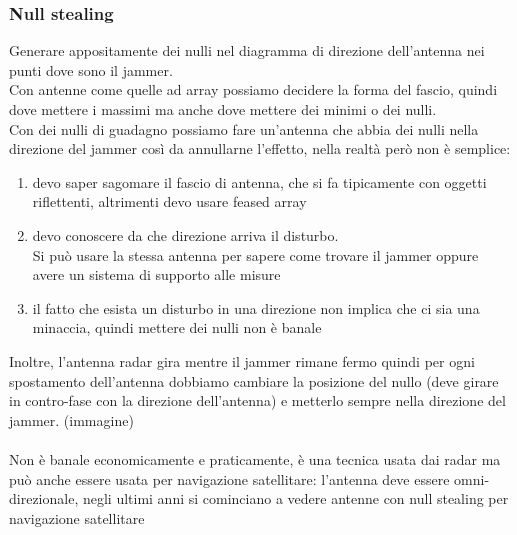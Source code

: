 \documentclass[oneside, 12pt]{extbook}
\begin{document}
\subsubsection{Null stealing}
Generare appositamente dei nulli nel diagramma di direzione dell'antenna nei punti dove sono il jammer.\\
Con antenne come quelle ad array possiamo decidere la forma del fascio, quindi dove mettere i massimi ma anche dove mettere dei minimi o dei nulli.\\
Con dei nulli di guadagno possiamo fare un'antenna che abbia dei nulli nella direzione del jammer così da annullarne l'effetto, nella realtà però non è semplice:
\begin{enumerate}
	\item devo saper sagomare il fascio di antenna, che si fa tipicamente con oggetti riflettenti, altrimenti devo usare feased array
	\item devo conoscere da che direzione arriva il disturbo.\\
	Si può usare la stessa antenna per sapere come trovare il jammer oppure avere un sistema di supporto alle misure
	\item il fatto che esista un disturbo in una direzione non implica che ci sia una minaccia, quindi mettere dei nulli non è banale
\end{enumerate}
Inoltre, l'antenna radar gira mentre il jammer rimane fermo quindi per ogni spostamento dell'antenna dobbiamo cambiare la posizione del nullo (deve girare in contro-fase con la direzione dell'antenna) e metterlo sempre nella direzione del jammer. (immagine)\\\\
Non è banale economicamente e praticamente, è una tecnica usata dai radar ma può anche essere usata per navigazione satellitare: l'antenna deve essere omni-direzionale, negli ultimi anni si cominciano a vedere antenne con null stealing per navigazione satellitare
\end{document}
